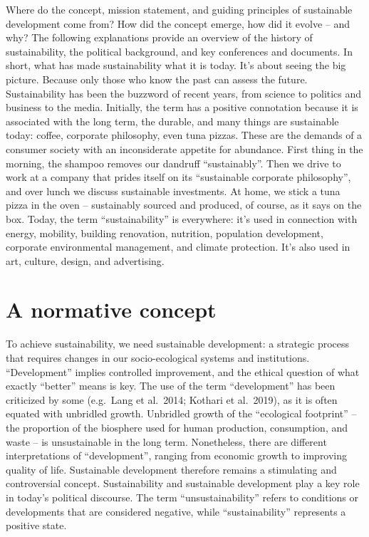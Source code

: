 \documentclass[
  letterpaper,
  DIV=11,
  numbers=noendperiod]{scrreprt}
\begin{document}
Where do the concept, mission statement, and guiding principles of
sustainable development come from? How did the concept emerge, how did
it evolve -- and why? The following explanations provide an overview of
the history of sustainability, the political background, and key
conferences and documents. In short, what has made sustainability what
it is today. It's about seeing the big picture. Because only those who
know the past can assess the future. Sustainability has been the
buzzword of recent years, from science to politics and business to the
media. Initially, the term has a positive connotation because it is
associated with the long term, the durable, and many things are
sustainable today: coffee, corporate philosophy, even tuna pizzas. These
are the demands of a consumer society with an inconsiderate appetite for
abundance. First thing in the morning, the shampoo removes our dandruff
``sustainably''. Then we drive to work at a company that prides itself
on its ``sustainable corporate philosophy'', and over lunch we discuss
sustainable investments. At home, we stick a tuna pizza in the oven --
sustainably sourced and produced, of course, as it says on the box.
Today, the term ``sustainability'' is everywhere: it's used in
connection with energy, mobility, building renovation, nutrition,
population development, corporate environmental management, and climate
protection. It's also used in art, culture, design, and advertising.

\chapter{A normative concept}\label{a-normative-concept}

To achieve sustainability, we need sustainable development: a strategic
process that requires changes in our socio-ecological systems and
institutions. ``Development'' implies controlled improvement, and the
ethical question of what exactly ``better'' means is key. The use of the
term ``development'' has been criticized by some (e.g.~Lang et al.~2014;
Kothari et al.~2019), as it is often equated with unbridled growth.
Unbridled growth of the ``ecological footprint'' -- the proportion of
the biosphere used for human production, consumption, and waste -- is
unsustainable in the long term. Nonetheless, there are different
interpretations of ``development'', ranging from economic growth to
improving quality of life. Sustainable development therefore remains a
stimulating and controversial concept. Sustainability and sustainable
development play a key role in today's political discourse. The term
``unsustainability'' refers to conditions or developments that are
considered negative, while ``sustainability'' represents a positive
state.
\end{document}
